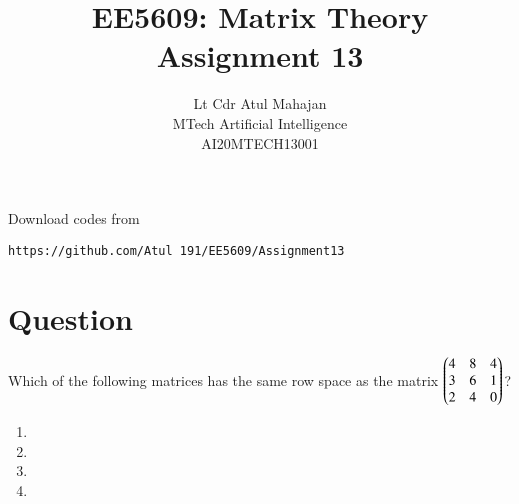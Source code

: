 \documentclass[journal,12pt,onecolumn]{IEEEtran}
\begin{document}
     \def\rightbox#1{\makebox[0in][r]{#1}}
     \def\centbox#1{\makebox[0in]{#1}}
     \def\topbox#1{\raisebox{-\baselineskip}[0in][0in]{#1}}
     \def\midbox#1{\raisebox{-0.5\baselineskip}[0in][0in]{#1}}
\vspace{3cm}
\onecolumn
\title{EE5609: Matrix Theory\\
          Assignment 13\\}
\author{Lt Cdr Atul Mahajan\\MTech Artificial Intelligence\\AI20MTECH13001 }
\maketitle
\bigskip
\renewcommand{\thefigure}{\theenumi}
\renewcommand{\thetable}{\theenumi}
Download codes from 
%
\begin{lstlisting}
https://github.com/Atul 191/EE5609/Assignment13
\end{lstlisting}
%
 
\section{Question}
Which of the following matrices has the same row space as the matrix $\begin{pmatrix}4&8&4\\3&6&1\\2&4&0\end{pmatrix}$?
\begin{enumerate}
    \item {}
    \item {}
    \item {}
    \item {}
\end{enumerate}
%
\end{document}
